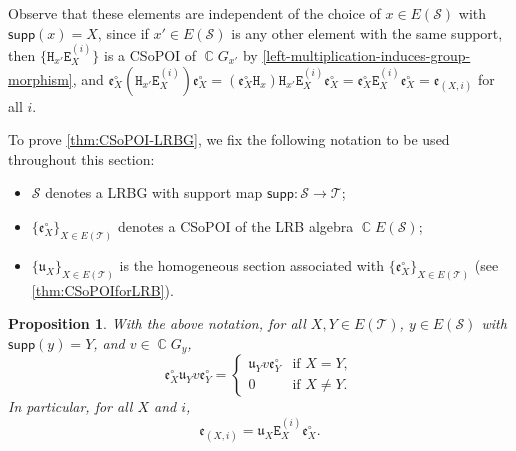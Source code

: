 \documentclass[11pt, oneside, reqno]{amsart}
\newtheorem{prop}[theorem]{Proposition}
\theoremstyle{definition}
\numberwithin{equation}{section}
\DeclareMathOperator{\C}{\mathbb{C}}
\def \SS{{\mathcal{S}}}
\def \TT{{\mathcal{T}}}
\def \kk{\C}
\def \uu{{\mathfrak{u}}}
\def \ee{{\mathfrak{e}}}
\def \supp{\mathsf{supp}}
\newcommand{\B}[1]{\mathtt{#1}} 			%
\begin{document}
Observe that these elements are independent of the choice of $x \in E(\SS)$ with $\supp(x) = X$,
since if $x' \in E(\SS)$ is any other element with the same support, then
$\{ \B{H}_{x'} \B{E}^{(i)}_X \}$ is a CSoPOI of $\kk G_{x'}$ by
\cref{left-multiplication-induces-group-morphism},
and $\ee^\circ_X (\B{H}_{x'} \B{E}^{(i)}_X) \ee^\circ_X = (\ee^\circ_X \B{H}_{x})
\B{H}_{x'} \B{E}^{(i)}_X \ee^\circ_X = \ee^\circ_X \B{E}^{(i)}_X \ee^\circ_X
= \ee_{(X,i)}$ for all $i$.

To prove \cref{thm:CSoPOI-LRBG}, we fix the following notation
to be used throughout this section:
\begin{itemize}
    \item
        $\SS$ denotes a LRBG with support map $\supp: \SS \to \TT$; 
    \item
        $\{ \ee^\circ_X \}_{X \in E(\TT)}$ denotes a CSoPOI of the LRB algebra $\kk E(\SS)$;
    \item
        $\{ \uu_X \}_{X \in E(\TT)}$ is the homogeneous section associated with
        $\{ \ee^\circ_X \}_{X \in E(\TT)}$ (see \cref{thm:CSoPOIforLRB}).
\end{itemize}

\begin{prop}\label{p:alt-eXi}
With the above notation,
for all $X,Y \in E(\TT)$, $y \in E(\SS)$ with $\supp(y) = Y$, and $v \in \kk G_y$,
\[
    \ee^\circ_X \uu_Y v \ee^\circ_Y =
    \begin{cases}
        \uu_Y v \ee^\circ_Y & \text{if } X = Y,\\
        0                       & \text{if } X \neq Y.
    \end{cases}
\]
In particular, for all $X$ and $i$,
\[\ee_{(X,i)} = \uu_X \B{E}^{(i)}_X \ee^\circ_X.\]
\end{prop}
\end{document}
